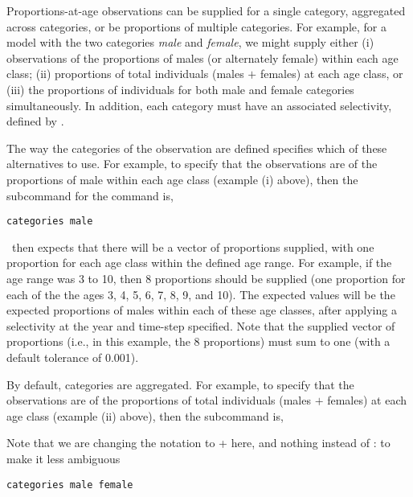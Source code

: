 Proportions-at-age observations can be supplied for a single category, aggregated across categories, or be proportions of multiple categories. For example, for a model with the two categories \emph{male} and \emph{female}, we might supply either (i) observations of the proportions of males (or alternately female) within each age class; (ii) proportions of total individuals (males $+$ females) at each age class, or (iii) the proportions of individuals for both male and female categories simultaneously. In addition, each category must have an associated selectivity, defined by . 

The way the categories of the observation are defined specifies which of these alternatives to use. For example, to specify that the observations are of the proportions of male within each age class (example (i) above), then the subcommand  for the  command is,

{\small{\begin{verbatim}
categories male
\end{verbatim}}}

\SPM\ then expects that there will be a vector of proportions supplied, with one proportion for each age class within the defined age range. For example, if the age range was 3 to 10, then 8 proportions should be supplied (one proportion for each of the the ages 3, 4, 5, 6, 7, 8, 9, and 10). The expected values will be the expected proportions of males within each of these age classes, after applying a selectivity at the year and time-step specified. Note that the supplied vector of proportions (i.e., in this example, the 8 proportions) must sum to one (with a default tolerance of 0.001).

By default, categories are aggregated. For example, to specify that the observations are of the proportions of total individuals (males $+$ females) at each age class (example (ii) above), then the subcommand  is,

\TOUNDO

Note that we are changing the notation to + here, and nothing instead of : to make it less ambiguous

{\small{\begin{verbatim}
categories male female
\end{verbatim}}}

\TOUNDOend

\TODO

